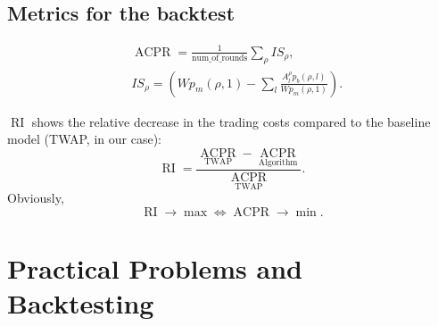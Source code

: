     \subsection{Metrics for the backtest}
        \begin{definition}
            \begin{align}
                & \operatorname*{ACPR} = \frac{1}{\operatorname{num\_of\_rounds}} \sum_\rho IS_\rho,\\
                & IS_\rho = \left( W  p_m(\rho, 1) - \sum_l \frac{A^\rho_l p_b(\rho, l)}{W p_m(\rho, 1)}\right).\nonumber
            \end{align}
        \end{definition}
        \begin{definition}
            $\operatorname*{RI}$ shows the relative decrease in the trading costs compared to the baseline model (TWAP, in our case):
            \begin{equation}
                \operatorname*{RI} = \frac{\operatorname*{ACPR}_{\text{TWAP}} - \operatorname*{ACPR}_{\text{Algorithm}}}{\operatorname*{ACPR}_{\text{TWAP}}}.
            \end{equation}
            Obviously, 
            \begin{equation*}
                \operatorname*{RI} \to \max \iff \operatorname*{ACPR} \to \min.
            \end{equation*}
        \end{definition}


\section{Practical Problems and Backtesting}\label{section:Backtest}
